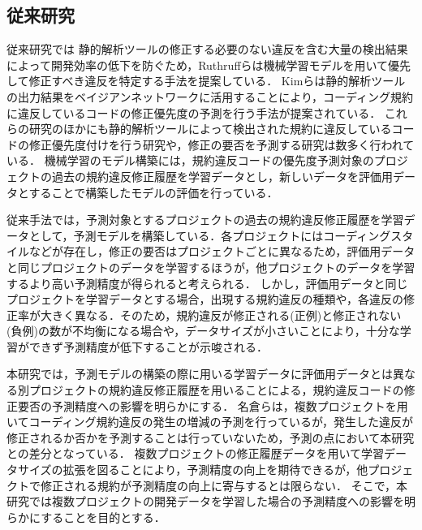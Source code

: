 \documentclass[submit,noauthor,ses,dvipdfmx]{ipsj}
\begin{document}
\subsection{従来研究}

従来研究では
静的解析ツールの修正する必要のない違反を含む大量の検出結果によって開発効率の低下を防ぐため，Ruthruffらは機械学習モデルを用いて優先して修正すべき違反を特定する手法を提案している\cite{JyuraiPre}．
Kimらは静的解析ツールの出力結果をベイジアンネットワークに活用することにより，コーディング規約に違反しているコードの修正優先度の予測を行う手法が提案されている\cite{beizu}．
これらの研究のほかにも静的解析ツールによって検出された規約に違反しているコードの修正優先度付けを行う研究や，修正の要否を予測する研究は数多く行われている\cite{Wang}\cite{Qing}\cite{HowFar}．
機械学習のモデル構築には，規約違反コードの優先度予測対象のプロジェクトの過去の規約違反修正履歴を学習データとし，新しいデータを評価用データとすることで構築したモデルの評価を行っている．

従来手法では，予測対象とするプロジェクトの過去の規約違反修正履歴を学習データとして，予測モデルを構築している．各プロジェクトにはコーディングスタイルなどが存在し，修正の要否はプロジェクトごとに異なるため，評価用データと同じプロジェクトのデータを学習するほうが，他プロジェクトのデータを学習するより高い予測精度が得られると考えられる．
しかし，評価用データと同じプロジェクトを学習データとする場合，出現する規約違反の種類や，各違反の修正率が大きく異なる\cite{Panichella}．そのため，規約違反が修正される(正例)と修正されない(負例)の数が不均衡になる場合や，データサイズが小さいことにより，十分な学習ができず予測精度が低下することが示唆される．

本研究では，予測モデルの構築の際に用いる学習データに評価用データとは異なる別プロジェクトの規約違反修正履歴を用いることによる，規約違反コードの修正要否の予測精度への影響を明らかにする．
名倉らは，複数プロジェクトを用いてコーディング規約違反の発生の増減の予測を行っているが，発生した違反が修正されるか否かを予測することは行っていないため，予測の点において本研究との差分となっている\cite{nagura}．
複数プロジェクトの修正履歴データを用いて学習データサイズの拡張を図ることにより，予測精度の向上を期待できるが，他プロジェクトで修正される規約が予測精度の向上に寄与するとは限らない．
そこで，本研究では複数プロジェクトの開発データを学習した場合の予測精度への影響を明らかにすることを目的とする．
\end{document}
